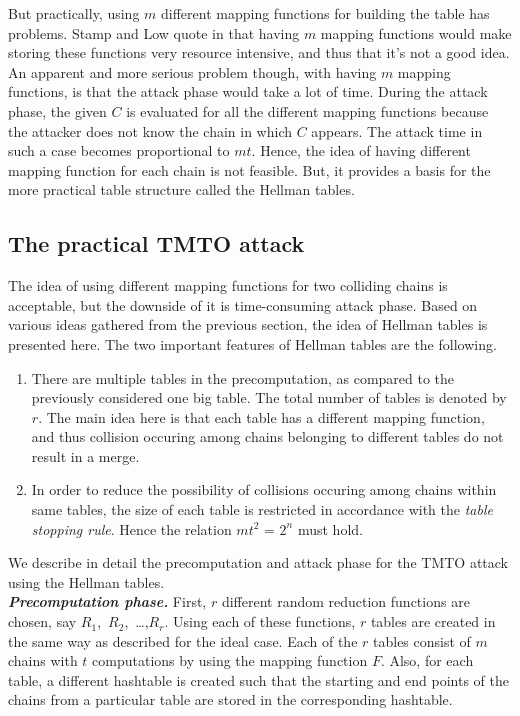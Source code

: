 But practically, using $m$ different mapping functions for building the table has problems. Stamp and Low quote in \cite{stamp2007acb} that having $m$ mapping functions would make storing these functions very resource intensive, and thus that it's not a good idea. An apparent and more serious problem though, with having $m$ mapping functions, is that the attack phase would take a lot of time. During the attack phase, the given $C$ is evaluated for all the different mapping functions because the attacker does not know the chain in which $C$ appears. The attack time in such a case becomes proportional to $mt$. Hence, the idea of having different mapping function for each chain is not feasible. But, it provides a basis for the more practical table structure called the Hellman tables. 

\subsection{The practical TMTO attack}

The idea of using different mapping functions for two colliding chains is acceptable, but the downside of it is time-consuming attack phase. Based on various ideas gathered from the previous section, the idea of Hellman tables \cite{hellman1980ctm} is presented here. The two important features of Hellman tables are the following.

\begin{enumerate}
\item There are multiple tables in the precomputation, as compared to the previously considered one big table. The total number of tables is denoted by $r$. The main idea here is that each table has a different mapping function, and thus collision occuring among chains belonging to different tables do not result in a merge.

\item In order to reduce the possibility of collisions occuring among chains within same tables, the size of each table is restricted in accordance with the \emph{table stopping rule}. Hence the relation $mt^2$ = $2^n$ must hold.
\end{enumerate}

We describe in detail the precomputation and attack phase for the TMTO attack using the Hellman tables.\\

\noindent \textit{\textbf{Precomputation phase.}} First, $r$ different random reduction functions are chosen, say \mbox{$R_1$, $R_2$, \ldots ,$R_r$}. Using each of these functions, $r$ tables are created in the same way as described for the ideal case. Each of the $r$ tables consist of $m$ chains with $t$ computations by using the mapping function $F$. Also, for each table, a different hashtable is created such that the starting and end points of the chains from a particular table are stored in the corresponding hashtable. 

